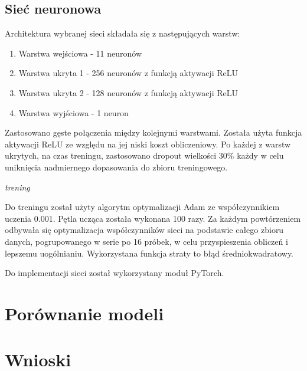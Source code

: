 \documentclass{article}
\begin{document}
\subsection{Sieć neuronowa}
Architektura wybranej sieci składała się z następujących warstw:
\begin{enumerate}
    \item Warstwa wejściowa - 11 neuronów
    \item Warstwa ukryta 1 - 256 neuronów z funkcją aktywacji ReLU
    \item Warstwa ukryta 2 - 128 neuronów z funkcją aktywacji ReLU
    \item Warstwa wyjściowa - 1 neuron
\end{enumerate}
Zastosowano gęste połączenia między kolejnymi warstwami. Została użyta funkcja aktywacji ReLU ze względu na jej niski koszt obliczeniowy. Po każdej z warstw ukrytych, na czas treningu, zastosowano dropout wielkości 30\% każdy w celu uniknięcia nadmiernego dopasowania do zbioru treningowego.

\textit{trening}

Do treningu został użyty algorytm optymalizacji Adam ze współczynnikiem uczenia 0.001. Pętla ucząca została wykonana 100 razy. Za każdym powtórzeniem odbywała się optymalizacja współczynników sieci na podstawie całego zbioru danych, pogrupowanego w serie po 16 próbek, w celu przyspieszenia obliczeń i lepszemu uogólnianiu. Wykorzystana funkcja straty to błąd średniokwadratowy.

Do implementacji sieci został wykorzystany moduł PyTorch.



\section{Porównanie modeli}

\section{Wnioski}
\end{document}
